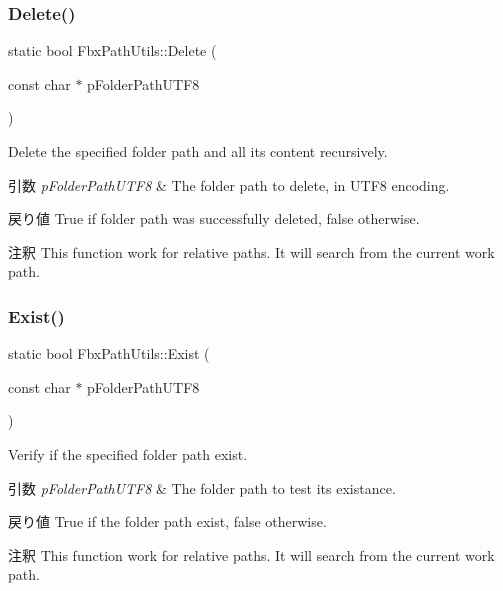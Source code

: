 \subsubsection{\texorpdfstring{Delete()}{Delete()}}
{\footnotesize\ttfamily static bool Fbx\+Path\+Utils\+::\+Delete (\begin{DoxyParamCaption}\item[{const char $\ast$}]{p\+Folder\+Path\+U\+T\+F8 }\end{DoxyParamCaption})\hspace{0.3cm}{\ttfamily [static]}}

Delete the specified folder path and all its content recursively. 
\begin{DoxyParams}{引数}
{\em p\+Folder\+Path\+U\+T\+F8} & The folder path to delete, in U\+T\+F8 encoding. \\
\hline
\end{DoxyParams}
\begin{DoxyReturn}{戻り値}
True if folder path was successfully deleted, false otherwise. 
\end{DoxyReturn}
\begin{DoxyRemark}{注釈}
This function work for relative paths. It will search from the current work path. 
\end{DoxyRemark}
\mbox{\label{class_fbx_path_utils_a5098828efd68614f77bc7bbe5f73f7cf}} 
\subsubsection{\texorpdfstring{Exist()}{Exist()}}
{\footnotesize\ttfamily static bool Fbx\+Path\+Utils\+::\+Exist (\begin{DoxyParamCaption}\item[{const char $\ast$}]{p\+Folder\+Path\+U\+T\+F8 }\end{DoxyParamCaption})\hspace{0.3cm}{\ttfamily [static]}}

Verify if the specified folder path exist. 
\begin{DoxyParams}{引数}
{\em p\+Folder\+Path\+U\+T\+F8} & The folder path to test its existance. \\
\hline
\end{DoxyParams}
\begin{DoxyReturn}{戻り値}
True if the folder path exist, false otherwise. 
\end{DoxyReturn}
\begin{DoxyRemark}{注釈}
This function work for relative paths. It will search from the current work path. 
\end{DoxyRemark}
\mbox{\label{class_fbx_path_utils_a0680775ad53444cc7dd91bdd537384ca}} 
